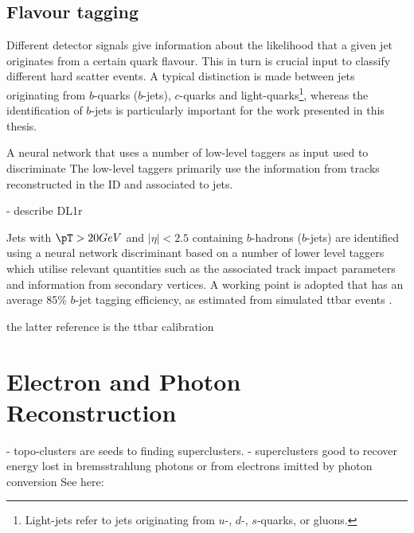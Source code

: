 \subsection{Flavour tagging}
Different detector signals give information about the likelihood that a given jet originates from a certain quark flavour. This in turn is crucial input to classify different hard scatter events.
A typical distinction is made between jets originating from $b$-quarks ($b$-jets), $c$-quarks and light-quarks\footnote{Light-jets refer to jets originating from $u$-, $d$-, $s$-quarks, or gluons.}, whereas the identification of $b$-jets is particularly important for the work presented in this thesis.

A neural network that uses a number of low-level taggers as input used to discriminate 
The low-level taggers primarily use the information from tracks reconstructed in the ID and associated to jets. 


- describe DL1r

Jets with $\pT > 20 GeV$ and $|\eta| < 2.5$ containing $b$-hadrons ($b$-jets) are identified using a neural network discriminant based on a number of lower level taggers which utilise relevant quantities such as the associated track impact parameters and information from secondary vertices. A working point is adopted that has an average 85\% $b$-jet tagging efficiency, as estimated from simulated ttbar events .

the latter reference is the ttbar calibration


\section{Electron and Photon Reconstruction}
\label{sec:electron-photon-reconstruction}
- topo-clusters are seeds to finding superclusters. 
- superclusters good to recover energy lost in bremsstrahlung photons or from electrons imitted by photon conversion
See here: 


